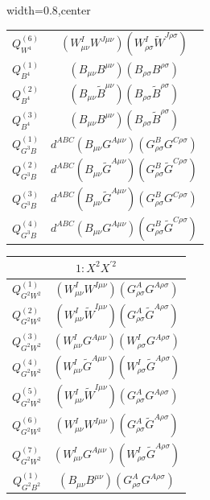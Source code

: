 \begin{table}[H]
\begin{center}
\begin{adjustbox}{width=0.8\textwidth,center}
\begin{minipage}[t]{6cm}
\begin{tabular}[t]{c|c}
%
$Q_{W^4}^{(6)}$  &  $(W_{\mu\nu}^I W^{J\mu\nu}) (W_{\rho\sigma}^I \widetilde{W}^{J\rho\sigma})$ \\
%
$Q_{B^4}^{(1)}$  &  $(B_{\mu\nu} B^{\mu\nu}) (B_{\rho\sigma} B^{\rho\sigma})$ \\
%
$Q_{B^4}^{(2)}$  &  $(B_{\mu\nu} \widetilde{B}^{\mu\nu}) (B_{\rho\sigma} \widetilde{B}^{\rho\sigma})$ \\
%
$Q_{B^4}^{(3)}$  &  $(B_{\mu\nu} B^{\mu\nu}) (B_{\rho\sigma} \widetilde{B}^{\rho\sigma})$ \\
%
$Q_{G^3B}^{(1)}$  &  $d^{ABC} (B_{\mu\nu} G^{A\mu\nu}) (G_{\rho\sigma}^B G^{C\rho\sigma})$ \\
%
$Q_{G^3B}^{(2)}$  &  $d^{ABC} (B_{\mu\nu} \widetilde{G}^{A\mu\nu}) (G_{\rho\sigma}^B \widetilde{G}^{C\rho\sigma})$ \\
%
$Q_{G^3B}^{(3)}$  &  $d^{ABC} (B_{\mu\nu} \widetilde{G}^{A\mu\nu}) (G_{\rho\sigma}^B G^{C\rho\sigma})$ \\
%
$Q_{G^3B}^{(4)}$  &  $d^{ABC} (B_{\mu\nu} G^{A\mu\nu}) (G_{\rho\sigma}^B \widetilde{G}^{C\rho\sigma})$
\end{tabular}
\end{minipage}
\hspace{1cm}
\begin{minipage}[t]{5cm}
\renewcommand{\arraystretch}{1.5}
\begin{tabular}[t]{c|c}
\multicolumn{2}{c}{\boldmath$1:X^2 X^{\prime 2}$} \\
\hline
$Q_{G^2W^2}^{(1)}$  &  $(W_{\mu\nu}^I W^{I\mu\nu}) (G_{\rho\sigma}^A G^{A\rho\sigma})$ \\
%
$Q_{G^2W^2}^{(2)}$  &  $(W_{\mu\nu}^I \widetilde{W}^{I\mu\nu}) (G_{\rho\sigma}^A \widetilde{G}^{A\rho\sigma})$ \\
%
$Q_{G^2W^2}^{(3)}$  &  $(W_{\mu\nu}^I G^{A\mu\nu}) (W_{\rho\sigma}^I G^{A\rho\sigma})$ \\
%
$Q_{G^2W^2}^{(4)}$  &  $(W_{\mu\nu}^I \widetilde{G}^{A\mu\nu}) (W_{\rho\sigma}^I \widetilde{G}^{A\rho\sigma})$ \\
%
$Q_{G^2W^2}^{(5)}$  &  $(W_{\mu\nu}^I \widetilde{W}^{I\mu\nu}) (G_{\rho\sigma}^A G^{A\rho\sigma})$ \\
%
$Q_{G^2W^2}^{(6)}$  &  $(W_{\mu\nu}^I W^{I\mu\nu}) (G_{\rho\sigma}^A \widetilde{G}^{A\rho\sigma})$ \\
%
$Q_{G^2W^2}^{(7)}$  &  $(W_{\mu\nu}^I G^{A\mu\nu}) (W_{\rho\sigma}^I \widetilde{G}^{A\rho\sigma})$ \\
%
$Q_{G^2B^2}^{(1)}$  &  $(B_{\mu\nu} B^{\mu\nu}) (G_{\rho\sigma}^A G^{A\rho\sigma})$ \\

\end{tabular}
\end{minipage}
\end{adjustbox}
\end{center}
\end{table}
